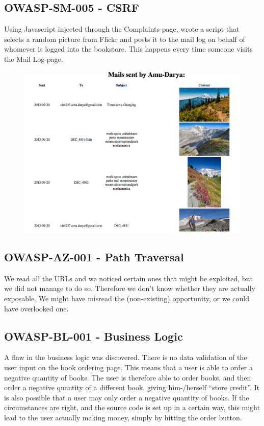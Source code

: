 \subsection{OWASP-SM-005 - CSRF}
Using Javascript injected through the Complaints-page, wrote a script that selects a random picture from Flickr and posts it to the mail log on behalf of whomever is logged into the bookstore. This happens every time someone visits the Mail Log-page.

\begin{figure}[!ht]
	\includegraphics[scale=0.8]{pics/testtest3.png}
\end{figure}

\subsection{OWASP-AZ-001 - Path Traversal}
We read all the URLs and we noticed certain ones that might be exploited, but we did not manage to do so. Therefore we don’t know whether they are actually exposable. We might have misread the (non-existing) opportunity, or we could have overlooked one.

\subsection{OWASP-BL-001 - Business Logic}
A flaw in the business logic was discovered. There is no data validation of the user input on the book ordering page. This means that a user is able to order a negative quantity of books. The user is therefore able to order books, and then order a negative quantity of a different book, giving him-/herself “store credit”. It is also possible that a user may only order a negative quantity of books. If the circumstances are right, and the source code is set up in a certain way, this might lead to the user actually making money, simply by hitting the order button.

